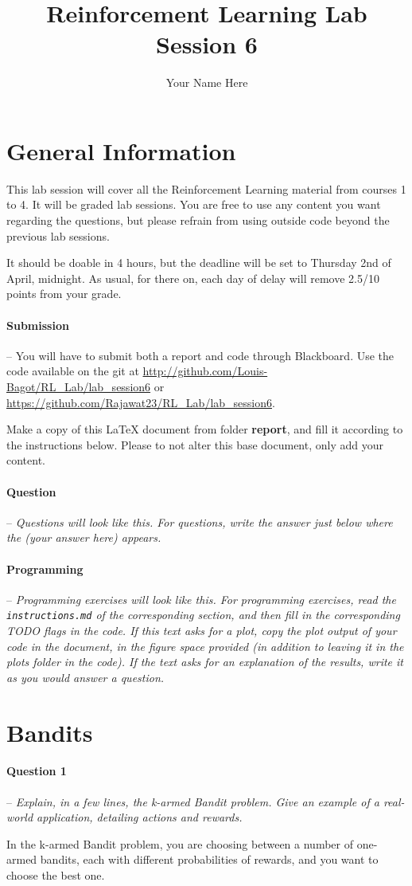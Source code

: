 \documentclass[a4paper]{article}
\title{Reinforcement Learning Lab Session 6}
\author{Your Name Here}
\newcommand{\question}[2]{
\paragraph{Question #1} -- \textit{#2}

}
\newcommand{\programming}[1]{
\paragraph{Programming} -- \textit{#1}

}
\begin{document}
\maketitle
\section*{General Information}
This lab session will cover all the Reinforcement Learning material from courses 1 to 4. It will be graded lab sessions. You are free to use any content you want regarding the questions, but please refrain from using outside code beyond the previous lab sessions.

It should be doable in 4 hours, but the deadline will be set to Thursday 2nd of April, midnight. As usual, for there on, each day of delay will remove 2.5/10 points from your grade.

\paragraph{Submission} --
You will have to submit both a report and code through Blackboard. Use the code available on the git at \url{http://github.com/Louis-Bagot/RL_Lab/lab_session6} or \url{https://github.com/Rajawat23/RL_Lab/lab_session6}.

Make a copy of this LaTeX document from folder \textbf{report}, and fill it according to the instructions below. Please to not alter this base document, only add your content.

\question{}{Questions will look like this. For questions, write the answer just below where the (your answer here) appears.}
\programming{Programming exercises will look like this. For programming exercises, read the \texttt{instructions.md} of the corresponding section, and then fill in the corresponding TODO flags in the code. If this text asks for a plot, copy the plot output of your code in the document, in the figure space provided (in addition to leaving it in the plots folder in the code). If the text asks for an explanation of the results, write it as you would answer a question.}

\tableofcontents
\newpage

\section{Bandits}
\question{1}{Explain, in a few lines, the k-armed Bandit problem. Give an example of a real-world application, detailing actions and rewards.}
In the k-armed Bandit problem, you are choosing between a number of one-armed bandits, each with different probabilities of rewards, and you want to choose the best one.
\end{document}
